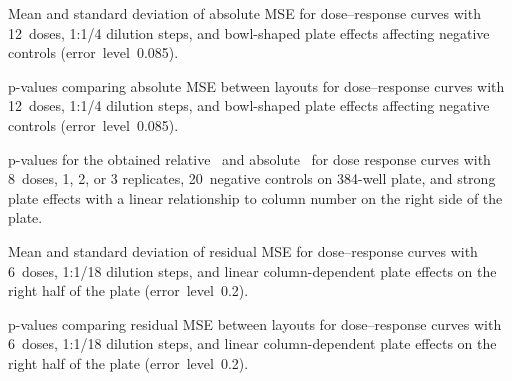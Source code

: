 \begin{table}[p]
    \centering
    \small
    
    \caption{Mean and standard deviation of absolute \ECIC{} MSE for dose--response curves with 12~doses, 1:1/4 dilution steps, and bowl-shaped plate effects affecting negative controls (error~level~0.085).}
    \label{tab:dr-absic50-mean-std-12doses-dil4-bowl-neg-controls-0.085}
\end{table}

\begin{table}[p]
    \centering
    \small
    
    \caption{p-values comparing absolute \ECIC{} MSE between layouts for dose--response curves with 12~doses, 1:1/4 dilution steps, and bowl-shaped plate effects affecting negative controls (error~level~0.085).}
    \label{tab:dr-absic50-pvalues-12doses-dil4-bowl-neg-controls-0.085}
\end{table}

\clearpage
\begin{table}[p]
    \centering
    \small
    
    \caption{p-values for the obtained relative~\ECIC{} and
      absolute~\ECIC{} for dose response curves with 8~doses, 1, 2, or
      3 replicates, 20~negative controls on 384-well plate, and strong
      plate effects with a linear relationship to column number on the
      right side of the plate.}
    \label{tab:pvalues-ic50-half-columns-neg-controls-0.4}
\end{table}
\begin{table}[p]
    \centering
    \small
    
    \caption{Mean and standard deviation of residual MSE for dose--response curves with 6~doses, 1:1/18 dilution steps, and linear column-dependent plate effects on the right half of the plate (error~level~0.2).}
    \label{tab:dr-residuals-mean-std-6doses-dil18-half-columns-neg-controls-0.2}
\end{table}

\begin{table}[p]
    \centering
    \small
    
    \caption{p-values comparing residual MSE between layouts for dose--response curves with 6~doses, 1:1/18 dilution steps, and linear column-dependent plate effects on the right half of the plate (error~level~0.2).}
    \label{tab:dr-residuals-pvalues-6doses-dil18-half-columns-neg-controls-0.2}
\end{table}

